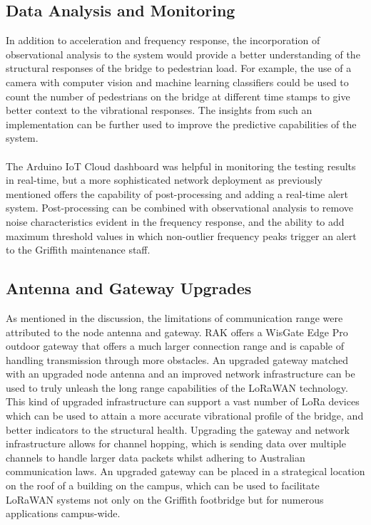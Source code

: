 \subsection{Data Analysis and Monitoring}
In addition to acceleration and frequency response, the incorporation of observational analysis to the system would provide a better understanding of the structural responses of the bridge to pedestrian load. For example, the use of a camera with computer vision and machine learning classifiers could be used to count the number of pedestrians on the bridge at different time stamps to give better context to the vibrational responses. The insights from such an implementation can be further used to improve the predictive capabilities of the system.\\\\
The Arduino IoT Cloud dashboard was helpful in monitoring the testing results in real-time, but a more sophisticated network deployment as previously mentioned offers the capability of post-processing and adding a real-time alert system. Post-processing can be combined with observational analysis to remove noise characteristics evident in the frequency response, and the ability to add maximum threshold values in which non-outlier frequency peaks trigger an alert to the Griffith maintenance staff.

\subsection{Antenna and Gateway Upgrades}
As mentioned in the discussion, the limitations of communication range were attributed to the node antenna and gateway. RAK offers a WisGate Edge Pro outdoor gateway that offers a much larger connection range and is capable of handling transmission through more obstacles. An upgraded gateway matched with an upgraded node antenna and an improved network infrastructure can be used to truly unleash the long range capabilities of the LoRaWAN technology. This kind of upgraded infrastructure can support a vast number of LoRa devices which can be used to attain a more accurate vibrational profile of the bridge, and better indicators to the structural health. Upgrading the gateway and network infrastructure allows for channel hopping, which is sending data over multiple channels to handle larger data packets whilst adhering to Australian communication laws. An upgraded gateway can be placed in a strategical location on the roof of a building on the campus, which can be used to facilitate LoRaWAN systems not only on the Griffith footbridge but for numerous applications campus-wide. 

